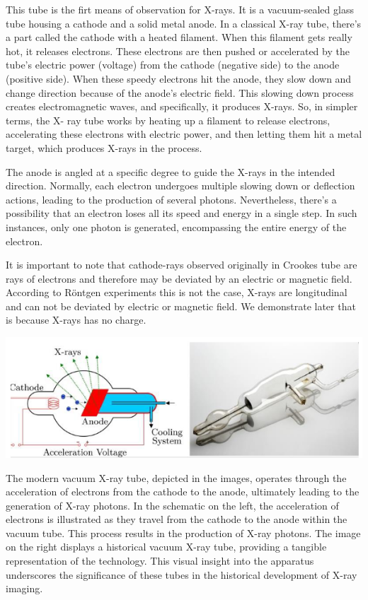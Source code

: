 \documentclass[a4paper,12pt]{report}
\begin{document}
This tube is the firt means of observation for X-rays. It is a vacuum-sealed glass
tube housing a cathode and a solid metal anode. In a classical X-ray tube, there's a part called the
cathode with a heated filament. When this filament gets really hot, it releases electrons. These
electrons are then pushed or accelerated by the tube's electric power (voltage) from the cathode
(negative side) to the anode (positive side). When these speedy electrons hit the anode, they slow
down and change direction because of the anode's electric field. This slowing down process
creates electromagnetic waves, and specifically, it produces X-rays. So, in simpler terms, the X-
ray tube works by heating up a filament to release electrons, accelerating these electrons with
electric power, and then letting them hit a metal target, which produces X-rays in the process.

The anode is angled at a specific degree to guide the X-rays in the intended direction. Normally,
each electron undergoes multiple slowing down or deflection actions, leading to the production of
several photons. Nevertheless, there's a possibility that an electron loses all its speed and energy
in a single step. In such instances, only one photon is generated, encompassing the entire energy
of the electron.

It is important to note that cathode-rays observed originally in Crookes tube are rays of electrons and therefore may be deviated by an electric or magnetic field. According to Röntgen experiments this is not the case, X-rays are longitudinal and can not be deviated by electric or magnetic field. We demonstrate later that is because X-rays has no charge.
\begin{center}
  \includegraphics[scale = 1.5 ]{modernTube.png}
  \label{modernTube}
\end{center}


The modern vacuum X-ray tube, depicted in the images, operates through the acceleration of electrons
from the cathode to the anode, ultimately leading to the generation of X-ray photons. In the
schematic on the left, the acceleration of electrons is illustrated as they travel from the cathode to
the anode within the vacuum tube. This process results in the production of X-ray photons. The
image on the right displays a historical vacuum X-ray tube, providing a tangible representation of
the technology. This visual insight into the apparatus underscores the significance of these tubes
in the historical development of X-ray imaging.
\end{document}
